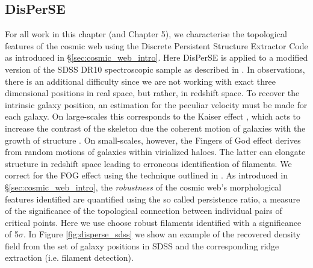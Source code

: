 \subsection{DisPerSE} \label{sec:disperse_sdss}
For all work in this chapter (and Chapter 5), we characterise the topological features of the cosmic web using the Discrete Persistent Structure Extractor Code \citep{sousbie2011a, sousbie2011b} as introduced in \S\ref{sec:cosmic_web_intro}. Here DisPerSE is applied to a modified version of the SDSS DR10 spectroscopic sample as described in \citet{tempel2014}. In observations, there is an additional difficulty since we are not working with exact three dimensional positions in real space, but rather, in redshift space. To recover the intrinsic galaxy position, an estimation for the peculiar velocity must be made for each galaxy. On large-scales this corresponds to the Kaiser effect \citep{kaiser1987}, which acts to increase the contrast of the skeleton due the coherent motion of galaxies with the growth of structure \citep[e.g.][]{shi2016}. On small-scales, however, the Fingers of God effect \citep[FOG;][]{jackson1972,tulley1978} derives from random motions of galaxies within virialized haloes. The latter can elongate structure in redshift space leading to erroneous identification of filaments. We correct for the FOG effect using the technique outlined in \citet{kraljic2018}. As introduced in \S\ref{sec:cosmic_web_intro}, the \textit{robustness} of the cosmic web's morphological features identified are quantified using the so called persistence ratio, a measure of the significance of the topological connection between individual pairs of critical points. Here we use choose robust filaments identified with a significance of 5$\sigma$. In Figure \ref{fig:disperse_sdss} we show an example of the recovered density field from the set of galaxy positions in SDSS and the corresponding ridge extraction (i.e. filament detection).

